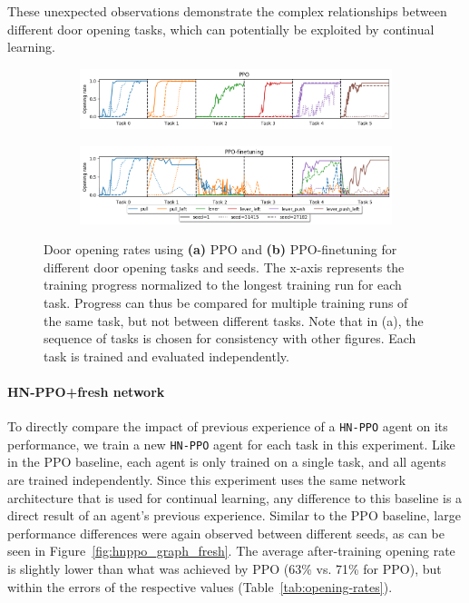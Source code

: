 \documentclass[dvipsnames]{article} %
\newcommand{\commentOLD}[1]{}
\newcommand{\jhOLD}[1] {\commentOLD{{\color{RawSienna} JH: #1}}}           %
\begin{document}
These unexpected observations demonstrate the complex relationships between different door opening tasks, which can potentially be exploited by continual learning. 

\begin{figure}[htbp]
\begin{subfigure}{\linewidth}
    \includegraphics[width=1.0\linewidth]{images/cl_timeseries_series7_config.png}
    \caption{}
    \label{fig:ppo-baseline-graph}
\end{subfigure}
\begin{subfigure}{\linewidth}
    \includegraphics[width=1.0\linewidth]{images/cl_timeseries_series8_config.png}
    \caption{}
    \label{fig:ppo-finetuning-graph}
\end{subfigure}
\caption{Door opening rates using \textbf{(a)} PPO and \textbf{(b)} PPO-finetuning for different door opening tasks and seeds. The x-axis represents the training progress normalized to the longest training run for each task. Progress can thus be compared for multiple training runs of the same task, but not between different tasks. Note that in (a), the sequence of tasks is chosen for consistency with other figures. Each task is trained and evaluated independently.\jhOLD{Instead of plotting all three seeds, how about plotting the median value and a shaded area?}}
\end{figure}

\paragraph{HN-PPO+fresh network} To directly compare the impact of previous experience of a \texttt{HN-PPO} agent on its performance, we train a new \texttt{HN-PPO} agent for each task in this experiment. Like in the PPO baseline, each agent is only trained on a single task, and all agents are trained independently. Since this experiment uses the same network architecture that is used for continual learning, any difference to this baseline is a direct result of an agent's previous experience. Similar to the PPO baseline, large performance differences were again observed between different seeds, as can be seen in Figure~\ref{fig:hnppo_graph_fresh}. The average after-training opening rate is slightly lower than what was achieved by PPO (63\% vs. 71\% for PPO), but within the errors of the respective values (Table~\ref{tab:opening-rates}).
\end{document}
